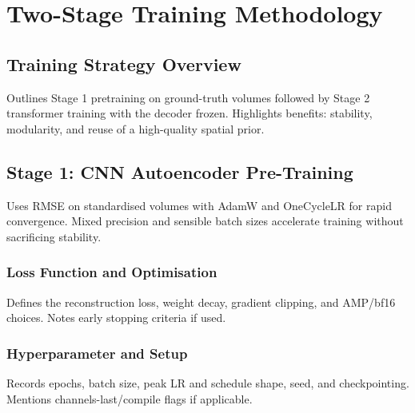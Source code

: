
\chapter{Two-Stage Training Methodology}

\section{Training Strategy Overview}

Outlines Stage 1 pretraining on ground-truth volumes followed by Stage 2 transformer training with the decoder frozen. Highlights benefits: stability, modularity, and reuse of a high-quality spatial prior.


\section{Stage 1: CNN Autoencoder Pre-Training}

Uses RMSE on standardised volumes with AdamW and OneCycleLR for rapid convergence. Mixed precision and sensible batch sizes accelerate training without sacrificing stability.


\subsection{Loss Function and Optimisation}

Defines the reconstruction loss, weight decay, gradient clipping, and AMP/bf16 choices. Notes early stopping criteria if used.


\subsection{Hyperparameter and Setup}

Records epochs, batch size, peak LR and schedule shape, seed, and checkpointing. Mentions channels-last/compile flags if applicable.

